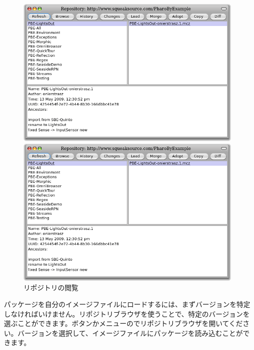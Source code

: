 \documentclass[a4paper,10pt,twoside]{book}
\begin{document}
\begin{figure}[hbt]
\ifluluelse
	{\centerline {\includegraphics[width=\textwidth]{BrowseRepository}}}
	{\centerline {\includegraphics[scale=0.7]{BrowseRepository}}}
\caption{リポジトリの閲覧
}
\end{figure}


パッケージを自分のイメージファイルにロードするには、まずバージョンを特定しなければいけません。リポジトリブラウザを使うことで、特定のバージョンを選ぶことができます。ボタンかメニューの\actclick でリポジトリブラウザを開いてください。バージョンを選択して、イメージファイルにパッケージを読み込むことができます。

\end{document}
